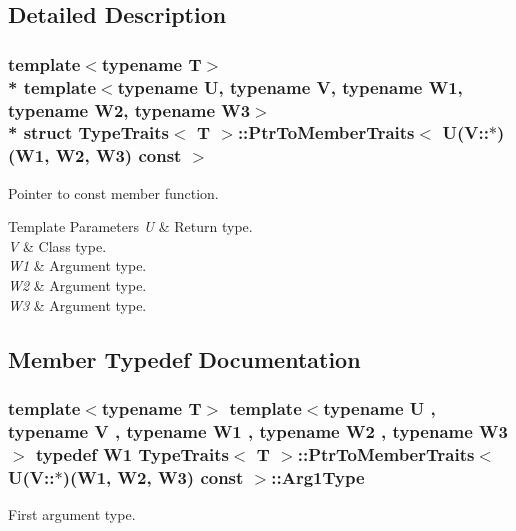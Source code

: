 \subsection{Detailed Description}
\subsubsection*{template$<$typename T$>$\\*
template$<$typename U, typename V, typename W1, typename W2, typename W3$>$\\*
struct Type\+Traits$<$ T $>$\+::\+Ptr\+To\+Member\+Traits$<$ U(\+V\+::$\ast$)(\+W1, W2, W3) const  $>$}

Pointer to const member function. 
\begin{DoxyTemplParams}{Template Parameters}
{\em U} & Return type. \\
\hline
{\em V} & Class type. \\
\hline
{\em W1} & Argument type. \\
\hline
{\em W2} & Argument type. \\
\hline
{\em W3} & Argument type. \\
\hline
\end{DoxyTemplParams}


\subsection{Member Typedef Documentation}
\subsubsection[{\texorpdfstring{Arg1\+Type}{Arg1Type}}]{\setlength{\rightskip}{0pt plus 5cm}template$<$typename T$>$ template$<$typename U , typename V , typename W1 , typename W2 , typename W3 $>$ typedef W1 {\bf Type\+Traits}$<$ T $>$\+::{\bf Ptr\+To\+Member\+Traits}$<$ U(V\+::$\ast$)(W1, W2, W3) const  $>$\+::{\bf Arg1\+Type}}\hypertarget{structTypeTraits_1_1PtrToMemberTraits_3_01U_07V_1_1_5_08_07W1_00_01W2_00_01W3_08_01const_01_01_4_a25e4fcf3c2294ffa0bd6a26a76713ffb}{}\label{structTypeTraits_1_1PtrToMemberTraits_3_01U_07V_1_1_5_08_07W1_00_01W2_00_01W3_08_01const_01_01_4_a25e4fcf3c2294ffa0bd6a26a76713ffb}
First argument type. 

